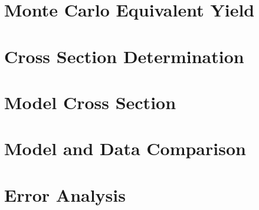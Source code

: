 \label{Chapter-7}

\hypertarget{Section-7.1}{%
\section{Monte Carlo Equivalent Yield}\label{Section-7.1}}

\hypertarget{Section-7.2}{%
\section{Cross Section Determination}\label{Section-7.2}}

\hypertarget{Section-7.3}{%
\section{Model Cross Section}\label{Section-7.3}}

\hypertarget{Section-7.4}{%
\section{Model and Data Comparison}\label{Section-7.4}}

\hypertarget{Section-7.5}{%
\section{Error Analysis}\label{Section-7.5}}


